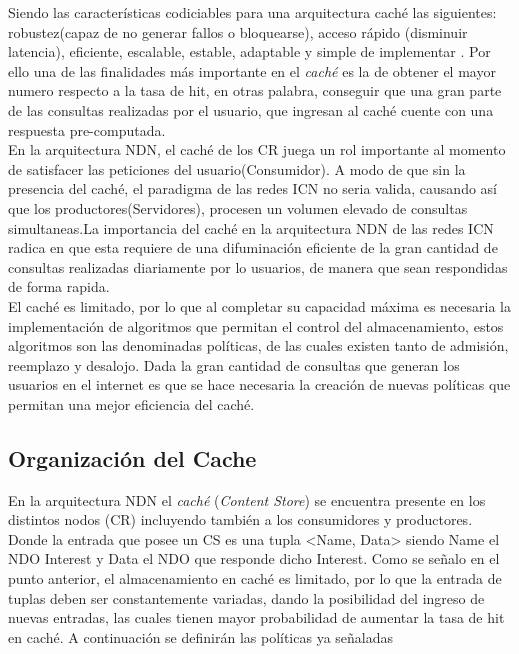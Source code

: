 \documentclass[12pt]{ociamthesis}  %
\begin{document}
Siendo las características codiciables para una arquitectura caché las siguientes: robustez(capaz de no generar fallos o bloquearse), acceso rápido (disminuir latencia), eficiente, escalable, estable, adaptable y simple de implementar \cite{wang1999survey}. Por ello una de las finalidades más importante en el \textit{caché} es la de obtener el mayor numero respecto a la tasa de hit, en otras palabra, conseguir que una gran parte de las consultas realizadas por el usuario, que ingresan al caché cuente con una respuesta pre-computada.\\

En la arquitectura NDN, el caché de los CR juega un rol importante al momento de satisfacer las peticiones del usuario(Consumidor). A modo de que sin la presencia del caché, el paradigma de las redes ICN no seria valida, causando así que los productores(Servidores), procesen un volumen elevado de consultas simultaneas.La importancia del caché en la arquitectura NDN de las redes ICN radica en que esta requiere de una difuminación eficiente de la gran cantidad de consultas realizadas diariamente por lo usuarios, de manera que sean respondidas de forma rapida.\\

El caché es limitado, por lo que al completar su capacidad máxima es necesaria la  implementación de algoritmos que permitan el control del almacenamiento, estos algoritmos son las denominadas políticas, de las cuales existen tanto de admisión, reemplazo y desalojo. Dada la gran cantidad de consultas que generan los usuarios en el internet es que se hace necesaria la creación de nuevas políticas que permitan una mejor eficiencia del caché.\\

\subsection{Organización del Cache}

En la arquitectura NDN el \textit{caché} (\textit{Content Store}) se encuentra presente en los distintos nodos (CR) incluyendo también a los consumidores y productores. Donde la entrada que posee un CS es una tupla <Name, Data> siendo Name el NDO Interest y Data el NDO que responde dicho Interest. Como se señalo en el punto anterior, el almacenamiento en caché es limitado, por lo que la entrada de tuplas deben ser constantemente variadas, dando la posibilidad del ingreso de nuevas entradas, las cuales tienen mayor probabilidad de aumentar la tasa de hit en caché. A continuación se definirán las políticas ya señaladas 
\end{document}
